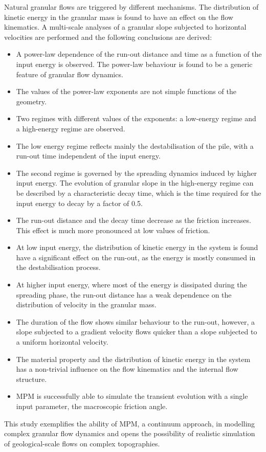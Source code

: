 Natural granular flows are triggered by different mechanisms. The distribution 
of kinetic energy in the granular mass is found to have an effect on the flow 
kinematics. A multi-scale analyses of a granular slope subjected to horizontal 
velocities are performed and the following conclusions are derived:

\begin{itemize}

\item A power-law dependence of the run-out distance and time as a 
function of the input energy is observed. The power-law behaviour is found to 
be a generic feature of granular flow dynamics. 

\item The values of the power-law exponents are not simple functions of the 
geometry. 

\item Two regimes with different values of the exponents: 
a low-energy regime and a high-energy regime are observed. 

\item The low energy regime reflects mainly the destabilisation of the pile, 
with a run-out time independent of the input energy.

\item The second regime is governed by the spreading dynamics 
induced by higher input energy. The evolution of granular slope in the 
high-energy regime can be described by a characteristic decay time, which is 
the time required for the input energy to decay by a factor of 0.5.

\item The run-out distance and the decay time decrease as the friction 
increases. This effect is much more pronounced at low values of friction.

\item  At low input energy, the distribution of kinetic energy in the system is 
found have a significant effect on the run-out, as the energy is mostly 
consumed in the destabilisation process. 
 
\item At higher input energy, where most of the energy is dissipated during 
the spreading phase, the run-out distance has a weak dependence on the 
distribution of velocity in the granular mass. 

\item The duration of the flow shows similar behaviour to the run-out, however, 
a slope subjected to a gradient velocity flows quicker than a slope subjected 
to a uniform horizontal velocity. 

\item The material property and the distribution of kinetic energy in the 
system has a non-trivial influence on the flow kinematics and the internal flow 
structure.

\item MPM is successfully able to simulate the transient evolution with a 
single input parameter, the macroscopic friction angle.

\end{itemize}

This study exemplifies the ability of MPM, a continuum approach,  in modelling 
complex granular flow dynamics and opens the possibility of realistic 
simulation of geological-scale flows on complex topographies.
